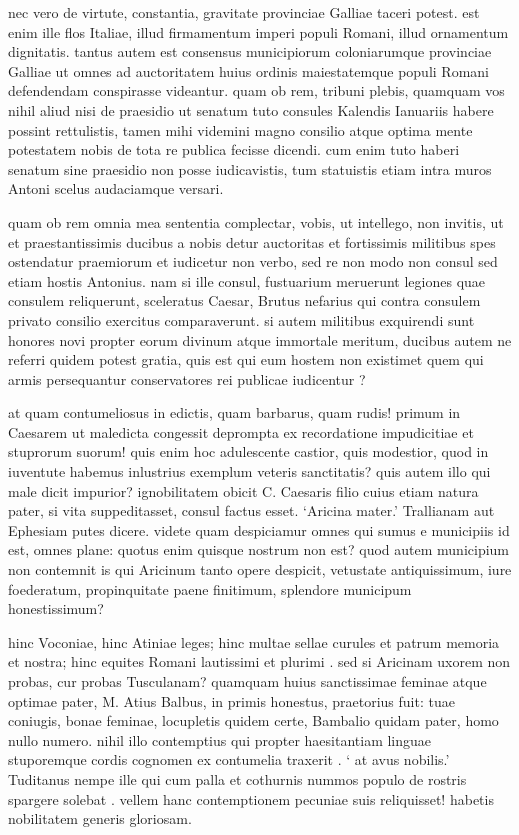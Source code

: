  nec vero de virtute, constantia, gravitate provinciae Galliae taceri potest. est enim ille flos Italiae, illud firmamentum imperi populi Romani, illud ornamentum dignitatis. tantus autem est consensus municipiorum coloniarumque provinciae Galliae ut omnes ad auctoritatem huius ordinis maiestatemque populi Romani defendendam conspirasse videantur. quam ob rem, tribuni plebis, quamquam vos nihil aliud nisi de praesidio ut senatum tuto consules Kalendis Ianuariis habere possint rettulistis, tamen mihi videmini magno consilio atque optima mente potestatem nobis de tota re publica fecisse dicendi. cum enim tuto haberi senatum sine praesidio non posse iudicavistis, tum statuistis etiam intra muros Antoni scelus audaciamque versari.

 quam ob rem omnia mea sententia complectar, vobis, ut intellego, non invitis, ut et praestantissimis ducibus a nobis detur auctoritas et fortissimis militibus spes ostendatur praemiorum et iudicetur non verbo, sed re non modo non consul sed etiam hostis Antonius. nam si ille consul, fustuarium meruerunt legiones quae consulem reliquerunt, sceleratus Caesar, Brutus nefarius qui contra consulem privato consilio exercitus comparaverunt. si autem militibus exquirendi sunt honores novi propter eorum divinum atque immortale meritum, ducibus autem ne referri quidem potest gratia, quis est qui eum hostem non existimet quem qui armis persequantur conservatores rei publicae iudicentur ?

 at quam contumeliosus in edictis, quam barbarus, quam rudis! primum in Caesarem ut maledicta congessit deprompta ex recordatione impudicitiae et stuprorum suorum! quis enim hoc adulescente castior, quis modestior, quod in iuventute habemus inlustrius exemplum veteris sanctitatis? quis autem illo qui male dicit impurior? ignobilitatem obicit C. Caesaris filio cuius etiam natura pater, si vita suppeditasset, consul factus esset. `Aricina mater.' Trallianam aut Ephesiam putes dicere. videte quam despiciamur omnes qui sumus e municipiis id est, omnes plane: quotus enim quisque nostrum non est? quod autem municipium non contemnit is qui Aricinum tanto opere despicit, vetustate antiquissimum, iure foederatum, propinquitate paene finitimum, splendore municipum honestissimum?

 hinc Voconiae, hinc Atiniae leges; hinc multae sellae curules et patrum memoria et nostra; hinc equites Romani lautissimi et plurimi . sed si Aricinam uxorem non probas, cur probas Tusculanam? quamquam huius sanctissimae feminae atque optimae pater, M. Atius Balbus, in primis honestus, praetorius fuit: tuae coniugis, bonae feminae, locupletis quidem certe, Bambalio quidam pater, homo nullo numero. nihil illo contemptius qui propter haesitantiam linguae stuporemque cordis cognomen ex contumelia traxerit . ` at avus nobilis.' Tuditanus nempe ille qui cum palla et cothurnis nummos populo de rostris spargere solebat . vellem hanc contemptionem pecuniae suis reliquisset! habetis nobilitatem generis gloriosam.

